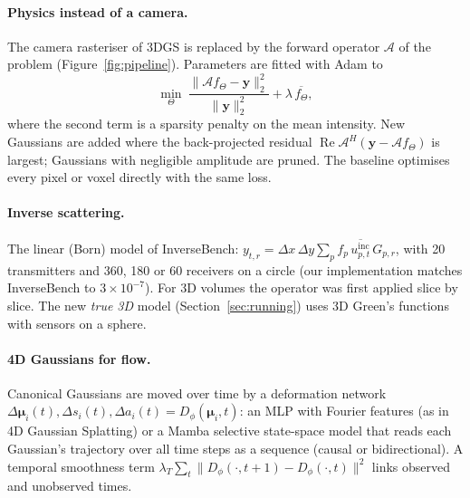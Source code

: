 \documentclass[11pt,a4paper]{article}
\newcommand{\vect}[1]{\bm{#1}}
\begin{document}
\paragraph{Physics instead of a camera.} The camera rasteriser of 3DGS is replaced by the forward operator
$\mathcal{A}$ of the problem (Figure~\ref{fig:pipeline}). Parameters are fitted with Adam to
\begin{equation}
\min_\Theta\ \frac{\lVert \mathcal{A} f_\Theta - \vect{y}\rVert_2^2}{\lVert \vect{y}\rVert_2^2} + \lambda\,\overline{f_\Theta},
\end{equation}
where the second term is a sparsity penalty on the mean intensity. New Gaussians are added where the back-projected
residual $\operatorname{Re}\mathcal{A}^{H}(\vect{y}-\mathcal{A}f_\Theta)$ is largest; Gaussians with negligible
amplitude are pruned. The baseline optimises every pixel or voxel directly with the same loss.

\paragraph{Inverse scattering.} The linear (Born) model of InverseBench:
$y_{t,r} = \Delta x\,\Delta y \sum_p f_p\, \overline{u^{\mathrm{inc}}_{p,t}}\, G_{p,r}$, with 20 transmitters and 360, 180
or 60 receivers on a circle (our implementation matches InverseBench to $3\times10^{-7}$). For 3D volumes the
operator was first applied slice by slice. The new \emph{true 3D} model (Section~\ref{sec:running}) uses 3D Green's
functions with sensors on a sphere.

\paragraph{4D Gaussians for flow.} Canonical Gaussians are moved over time by a deformation network
$\Delta\vect{\mu}_i(t), \Delta s_i(t), \Delta a_i(t) = D_\phi(\vect{\mu}_i, t)$: an MLP with Fourier features
(as in 4D Gaussian Splatting) or a Mamba selective state-space model that reads each Gaussian's trajectory over
all time steps as a sequence (causal or bidirectional). A temporal smoothness term
$\lambda_T \sum_t \lVert D_\phi(\cdot,t{+}1) - D_\phi(\cdot,t)\rVert^2$ links observed and unobserved times.
\end{document}

